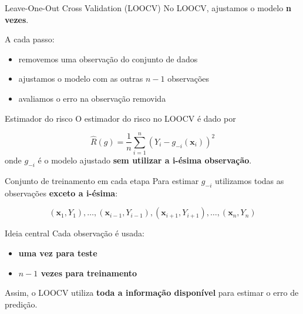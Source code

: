 \documentclass[
  ignorenonframetext,
  aspectratio=169,
]{beamer}
\providecommand{\tightlist}{%
  \setlength{\itemsep}{0pt}\setlength{\parskip}{0pt}}
\begin{document}
\begin{frame}
\begin{block}{Leave-One-Out Cross Validation (LOOCV)}
\label{leave-one-out-cross-validation-loocv}
No LOOCV, ajustamos o modelo \textbf{n vezes}.

A cada passo:

\begin{itemize}
\tightlist
\item
  removemos uma observação do conjunto de dados
\item
  ajustamos o modelo com as outras \(n-1\) observações
\item
  avaliamos o erro na observação removida
\end{itemize}
\end{block}
\end{frame}

\begin{frame}
\begin{block}{Estimador do risco}
\label{estimador-do-risco}
O estimador do risco no LOOCV é dado por

\[
\hat{R}(g) =
\frac{1}{n}
\sum_{i=1}^{n}
(Y_i - g_{-i}(\mathbf{x}_i))^2
\] onde \(g_{-i}\) é o modelo ajustado \textbf{sem utilizar a i-ésima
observação}.
\end{block}

\begin{block}{Conjunto de treinamento em cada etapa}
\label{conjunto-de-treinamento-em-cada-etapa}
Para estimar \(g_{-i}\) utilizamos todas as observações \textbf{exceto a
i-ésima}:

\[
(\mathbf{x}_1,Y_1),\ldots,(\mathbf{x}_{i-1},Y_{i-1}),(\mathbf{x}_{i+1},Y_{i+1}),\ldots,(\mathbf{x}_n,Y_n)
\]
\end{block}
\end{frame}

\begin{frame}
\begin{block}{Ideia central}
\label{ideia-central-1}
Cada observação é usada:

\begin{itemize}
\tightlist
\item
  \textbf{uma vez para teste}
\item
  \textbf{\(n-1\) vezes para treinamento}
\end{itemize}

Assim, o LOOCV utiliza \textbf{toda a informação disponível} para
estimar o erro de predição.
\end{block}
\end{frame}
\end{document}
